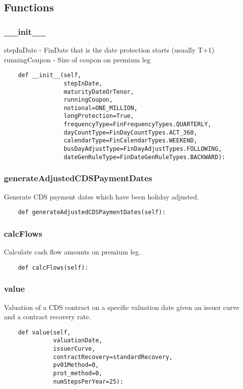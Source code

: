\documentclass[twoside,11pt]{book}
\begin{document}
\subsection*{Functions}

\subsubsection*{{\bf \_\_init\_\_}}
stepInDate - FinDate that is the date protection starts (usually T+1) runningCoupon - Size of coupon on premium leg  

\begin{lstlisting}
    def __init__(self,
                 stepInDate,
                 maturityDateOrTenor,
                 runningCoupon,
                 notional=ONE_MILLION,
                 longProtection=True,
                 frequencyType=FinFrequencyTypes.QUARTERLY,
                 dayCountType=FinDayCountTypes.ACT_360,
                 calendarType=FinCalendarTypes.WEEKEND,
                 busDayAdjustType=FinDayAdjustTypes.FOLLOWING,
                 dateGenRuleType=FinDateGenRuleTypes.BACKWARD):
\end{lstlisting}

\subsubsection*{{\bf generateAdjustedCDSPaymentDates}}
Generate CDS payment dates which have been holiday adjusted. 

\begin{lstlisting}
    def generateAdjustedCDSPaymentDates(self):
\end{lstlisting}

\subsubsection*{{\bf calcFlows}}
Calculate cash flow amounts on premium leg.  

\begin{lstlisting}
    def calcFlows(self):
\end{lstlisting}

\subsubsection*{{\bf value}}
Valuation of a CDS contract on a specific valuation date given  an issuer curve and a contract recovery rate. 

\begin{lstlisting}
    def value(self,
              valuationDate,
              issuerCurve,
              contractRecovery=standardRecovery,
              pv01Method=0,
              prot_method=0,
              numStepsPerYear=25):
\end{lstlisting}
\end{document}
